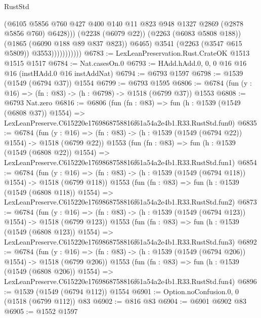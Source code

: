 \begin{lexlean}{RustStd}
\begin{coremodule}
                                (@6105
                                  @5856
                                  @760
                                  @427
                                  @400
                                  @140
                                  @11
                                  @823
                                  @948
                                  @1327
                                  @2869
                                  (@2878 @5856 @760)
                                  @6428)))
                            (@2238 (@6079 @22))
                            (@2263 (@6083 @5808 @188))
                            (@1865 (@6090 @188 @89 @837 @823))
                            @6465)
                          @3541
                          (@2263 (@3547 @615 @5809))
                          @3553)))))))))))
@6783 := LexLeanPreservation.Rust.CrateOK @1513 @1515 @1517
@6784 := Nat.casesOn.{0}
@6793 := HAdd.hAdd.{0, 0, 0} @16 @16 @16 (instHAdd.{0} @16 instAddNat)
@6794 := @6793 @1597
@6798 := @1539 (@1549 (@6794 @37)) @1554
@6799 := @6793 @1595
@6806 := @6784 (fun (y : @16) => (fn : @83) -> (h : @6798) -> @1518 (@6799 @37)) @1553
@6808 := @6793 Nat.zero
@6816 := @6806
    (fun (fn : @83) =>
    fun (h : @1539 (@1549 (@6808 @37)) @1554) =>
    LexLeanPreserve.C615220e1769868758816f61a54a2e4b1.R33.RustStd.fun0)
@6835 := @6784
    (fun (y : @16) => (fn : @83) -> (h : @1539 (@1549 (@6794 @22)) @1554) -> @1518 (@6799 @22))
    @1553
    (fun (fn : @83) =>
    fun (h : @1539 (@1549 (@6808 @22)) @1554) =>
    LexLeanPreserve.C615220e1769868758816f61a54a2e4b1.R33.RustStd.fun1)
@6854 := @6784
    (fun (y : @16) => (fn : @83) -> (h : @1539 (@1549 (@6794 @118)) @1554) -> @1518 (@6799 @118))
    @1553
    (fun (fn : @83) =>
    fun (h : @1539 (@1549 (@6808 @118)) @1554) =>
    LexLeanPreserve.C615220e1769868758816f61a54a2e4b1.R33.RustStd.fun2)
@6873 := @6784
    (fun (y : @16) => (fn : @83) -> (h : @1539 (@1549 (@6794 @123)) @1554) -> @1518 (@6799 @123))
    @1553
    (fun (fn : @83) =>
    fun (h : @1539 (@1549 (@6808 @123)) @1554) =>
    LexLeanPreserve.C615220e1769868758816f61a54a2e4b1.R33.RustStd.fun3)
@6892 := @6784
    (fun (y : @16) => (fn : @83) -> (h : @1539 (@1549 (@6794 @206)) @1554) -> @1518 (@6799 @206))
    @1553
    (fun (fn : @83) =>
    fun (h : @1539 (@1549 (@6808 @206)) @1554) =>
    LexLeanPreserve.C615220e1769868758816f61a54a2e4b1.R33.RustStd.fun4)
@6896 := @1539 (@1549 (@6794 @112)) @1554
@6901 := Option.noConfusion.{0, 0} (@1518 (@6799 @112)) @83
@6902 := @816 @83
@6904 := @6901 @6902 @83
@6905 := @1552 @1597

\end{coremodule}
\end{lexlean}
